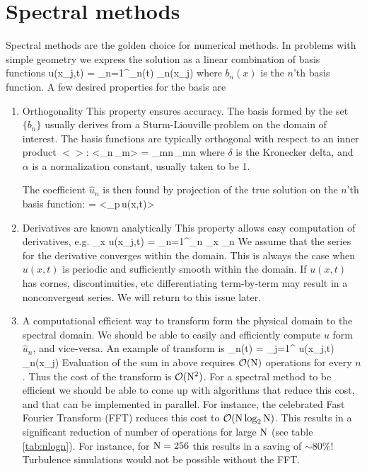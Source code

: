 \documentclass[11pt]{article}
\begin{document}
\section{Spectral methods}
Spectral methods are the golden choice for numerical methods. In problems with simple geometry we express the solution as a linear combination of basis functions
\beq
\label{eq:lin_comb_basis}
u(x_j,t) = \sum_{n=1}^\nmax {}_n(t) \sb_n(x_j)\com
\eeq
where $b_n(x)$ is the $n$'th basis function. A few desired properties for the basis are

\begin{enumerate}

        
\item Orthogonality 
    \subitem This property ensures accuracy. The basis formed by the set $\{b_n\}$ usually derives from a Sturm-Liouville problem on the domain of interest. The basis functions are typically orthogonal with respect to an inner product $<>$:
\beq
\label{eq:orthogonality}
<\sb_n\,\sb_m> = \alpha_{mn}\,\delta_{mn}\com
\eeq
where $\delta$ is the Kronecker delta, and $\alpha$ is a normalization constant, usually taken to be 1.

The coefficient $\hat{u}_n$ is then found by projection of the true solution on the $n$'th basis function:
\beq
\label{eq:projec}
 = <\sb_p\,u(x,t)>\per
\eeq

\item Derivatives are known analytically
    \subitem This property allows easy computation of derivatives, e.g.
    \beq
        \label{eq:deriv_basis}
        \p_x u(x_j,t) = \sum_{n=1}^\nmax {}_n \p_x \sb_n\per
    \eeq
    We assume that the series for the derivative converges within the domain. This is always the case when $u(x,t)$ is periodic and sufficiently smooth within the domain. If $u(x,t)$ has cornes, discontinuities, etc differentiating term-by-term may result in a nonconvergent series. We will return to this issue later.

\item A computational efficient way to transform form the physical domain to the spectral domain.
    \subitem We should be able to easily and efficiently compute $u$ form $\hat{u}_n$, and vice-versa. An example of transform is
    \beq
        \label{eq:ex_transform}
        _n(t) =  \sum_{j=1}^{} u(x_j,t) \sb_n(x_j)\com
    \eeq
    Evaluation of the sum in above requires $\mathcal{O}(\mathrm{N})$ operations for every $n$. Thus the cost of the transform is  $\mathcal{O}(\mathrm{N}^2)$. For a spectral method to be efficient we should be able to come up with algorithms that reduce this cost, and that can be implemented in parallel. For instance, the celebrated Fast Fourier Transform (FFT)
    reduces this cost to $\mathcal{O}(\mathrm{N} \log_2 \mathrm{N})$. This results in a significant reduction of number of operations for large $\mathrm{N}$ (see table \ref{tab:nlogn}). For instance, for $\mathrm{N}=256$ this results in a saving of $\sim80\%$! Turbulence simulations would not be possible without the  FFT.


\end{enumerate}
\end{document}
